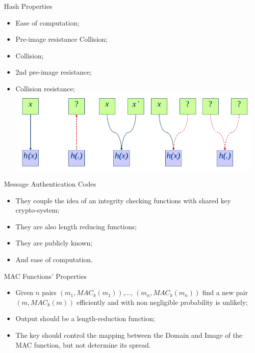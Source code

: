 \documentclass[12pt,table,xcolor={dvipsnames}]{beamer}
\begin{document}
\begin{frame}{Hash Properties}
\begin{itemize}
\item Ease of computation;\pause
\item Pre-image resistance Collision;\pause
\item Collision;\pause
\item 2nd pre-image resistance;\pause
\item Collision resistance;\\\pause
\includegraphics[scale=.3]{hash_properties.png}
\end{itemize}
\end{frame}

\begin{frame}{Message Authentication Codes}
\begin{itemize}
\item They couple the idea of an integrity checking functions with shared key crypto-system;\pause
\item They are also length reducing functions;\pause
\item They are publicly known;\pause
\item And ease of computation.
\end{itemize}
\end{frame}

\begin{frame}{MAC Functions' Properties}
\begin{itemize}
\item Given $n$ pairs $(m_1, MAC_k(m_1))$,..., $(m_n, MAC_k(m_n))$ find a new  pair $(m, MAC_k(m))$ efficiently and with non negligible probability is unlikely;\pause
\item Output should be a length-reduction function;\pause
\item The key should control the mapping between the Domain and Image of the MAC function, but not determine its spread.
\end{itemize}
\end{frame}
\end{document}
